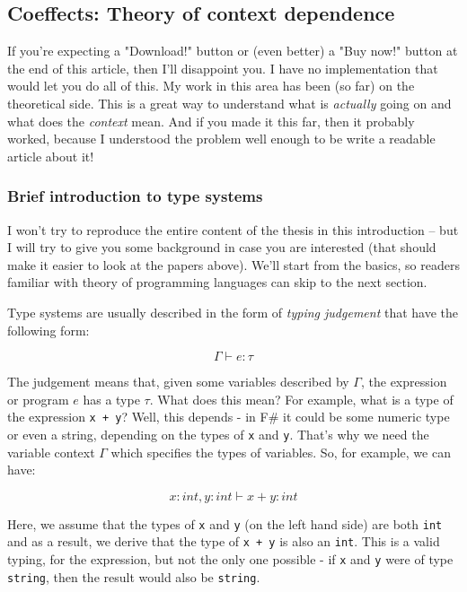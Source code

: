 
\subsection{Coeffects: Theory of context dependence}

If you're expecting a "Download!" button or (even better) a "Buy now!" button at the end of this article,
then I'll disappoint you. I have no implementation that would let you do all of this.
My work in this area has been (so far) on the theoretical side. This is a great way to 
understand what is \emph{actually} going on and what does the \emph{context} mean. And if you made
it this far, then it probably worked, because I understood the problem well enough to be 
write a readable article about it!

\subsubsection{Brief introduction to type systems}

I won't try to reproduce the entire content of the thesis in this introduction -- but I will
try to give you some background in case you are interested (that should make it easier to
look at the papers above). We'll start from the basics, so readers familiar with theory of 
programming languages can skip to the next section.

Type systems are usually described in the form of \emph{typing judgement} that have the following form:

\begin{equation}
\Gamma \vdash e : \tau
\end{equation}

The judgement means that, given some variables described by $\Gamma$, the expression or program $e$
has a type $\tau$. What does this mean? For example, what is a type of the expression \texttt{x + y}?
Well, this depends - in F\# it could be some numeric type or even a string, depending on the types
of \texttt{x} and \texttt{y}. That's why we need the variable context $\Gamma$ which specifies the types of variables.
So, for example, we can have:

\begin{equation}
x:int, y:int \vdash x+y : int
\end{equation}

Here, we assume that the types of \texttt{x} and \texttt{y} (on the left hand side) are both \texttt{int} and as a result,
we derive that the type of \texttt{x + y} is also an \texttt{int}. This is a valid typing, for the expression, but
not the only one possible - if \texttt{x} and \texttt{y} were of type \texttt{string}, then the result would also be 
 \texttt{string}.

